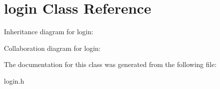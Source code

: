 \hypertarget{classlogin}{}\section{login Class Reference}
\label{classlogin}


Inheritance diagram for login\+:


Collaboration diagram for login\+:


The documentation for this class was generated from the following file\+:\begin{DoxyCompactItemize}
\item 
login.\+h\end{DoxyCompactItemize}
